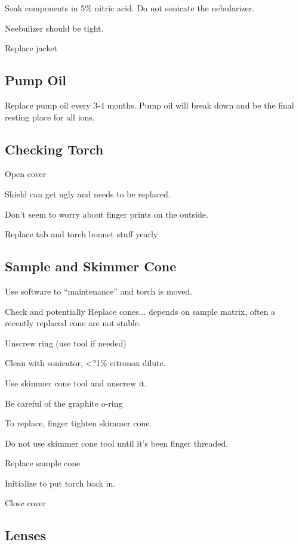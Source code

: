\documentclass[12pt]{../SOP4_alpha}\usepackage[]{graphicx}\usepackage[]{color}
\begin{document}
\NP Soak components in 5\% nitric acid. Do not sonicate the nebularizer.

\NP Neebulizer should be tight.

\NP Replace jacket

\subsection{Pump Oil}

\NP Replace pump oil every 3-4 months. Pump oil will break down and be the final resting place for all ions.

\NP

\subsection{Checking Torch}

\NP Open cover

\NP Shield can get ugly and needs to be replaced.

\NP Don't seem to worry about finger prints on the outside.

\NP Replace tab and torch bonnet stuff yearly

\subsection{Sample and Skimmer Cone}

\NP Use software to ``maintenance'' and torch is moved.

\NP Check and potentially Replace cones... depends on sample matrix, often a recently replaced cone are not stable. 

\NP Unscrew ring (use tool if needed)

\NP Clean with sonicator, <?1\% citronox dilute.

\NP Use skimmer cone tool and unscrew it.

\NP Be careful of the graphite o-ring

\NP To replace, finger tighten skimmer cone.

\NP Do not use skimmer cone tool until it's been finger threaded.

\NP Replace sample cone

\NP Initialize to put torch back in.

\NP Close cover

\subsection{Lenses}
\end{document}
